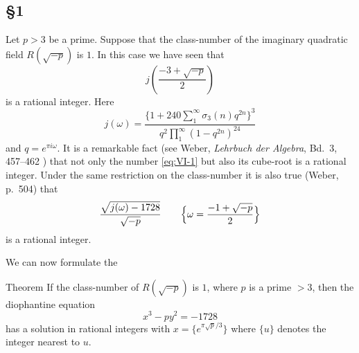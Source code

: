 
\subsection*{\texorpdfstring{§1}{§1}}

Let $p>3$ be a prime. Suppose that the class-number of the imaginary
quadratic field $R(\sqrt{-p})$ is $1$. In this case we have seen that
\[
j\!\left(\frac{-3+\sqrt{-p}}{2}\right)
\tag{1}\label{eq:VI-1}
\]
is a rational integer. Here
\[
j(\omega)=\frac{\bigl\{1+240\sum_{1}^{\infty}\sigma_{3}(n)q^{2n}\bigr\}^{3}}
{q^{2}\prod_{1}^{\infty}(1-q^{2n})^{24}}
\tag{2}\label{eq:VI-2}
\]
and $q=e^{\pi i\omega}$. It is a remarkable fact (see Weber,
\emph{Lehrbuch der Algebra}, Bd.~3, 457--462 \cite{weber1908algebra})
that not only the number \eqref{eq:VI-1} but also its cube-root is a
rational integer. Under the same restriction on the class-number it is
also true (Weber, p.~504) that
\[
\frac{\sqrt{j(\omega)-1728}}{\sqrt{-p}}
\qquad\Bigl\{\omega=\frac{-1+\sqrt{-p}}{2}\Bigr\}
\]
is a rational integer.

We can now formulate the

\begin{namedstmt}{Theorem}
If the class-number of $R(\sqrt{-p})$ is $1$, where $p$ is a prime $>3$,
then the diophantine equation
\[
x^{3}-py^{2}=-1728
\]
has a solution in rational integers with $x=\bigl\{e^{\pi\sqrt{p}/3}
\bigr\}$ where $\{u\}$ denotes the integer nearest to $u$.
\end{namedstmt}

